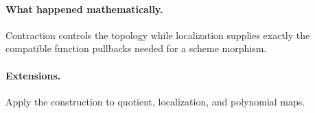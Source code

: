 \paragraph{What happened mathematically.}
Contraction controls the topology while localization supplies exactly the compatible function pullbacks needed for a scheme morphism.

\paragraph{Extensions.}
Apply the construction to quotient, localization, and polynomial maps.
\fi
